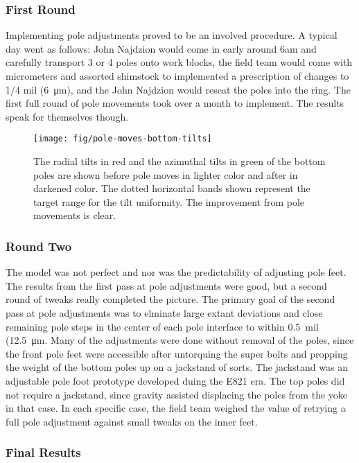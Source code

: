 \subsubsection{First Round}

Implementing pole adjustments proved to be an involved procedure.  A typical day went as follows: John Najdzion would come in early around 6am and carefully transport 3 or 4 poles onto work blocks, the field team would come with micrometers and assorted shimstock to implemented a prescription of changes to 1/4 mil (\SI{6}{\micro\meter}), and the John Najdzion  would reseat the poles into the ring.  The first full round of pole movements took over a month to implement.  The results speak for themselves though.

\begin{figure}
\texttt{[image: fig/pole-moves-bottom-tilts]}
\caption{The radial tilts in red and the azimuthal tilts in green of the bottom poles are shown before pole moves in lighter color and after in darkened color.  The dotted horizontal bands shown represent the target range for the tilt uniformity.  The improvement from pole movements is clear.}
\label{fig:pole-moves-bottom-tilts}
\end{figure}

\subsubsection{Round Two}

The model was not perfect and nor was the predictability of adjusting pole feet.  The results from the first pass at pole adjustments were good, but a second round of tweaks really completed the picture.  The primary goal of the second pass at pole adjustments was to elminate large extant deviations and close remaining pole steps in the center of each pole interface to within \SI{0.5}{mil} (\SI{12.5}{\micro\meter}.  Many of the adjustments were done without removal of the poles, since the front pole feet were accessible after untorquing the super bolts and propping the weight of the bottom poles up on a jackstand of sorts.  The jackstand was an adjustable pole foot prototype developed duing the E821 era.  The top poles did not require a jackstand, since gravity assisted displacing the poles from the yoke in that case.  In each specific case, the field team weighed the value of retrying a full pole adjustment against small tweaks on the inner feet.  

\subsubsection{Final Results}


